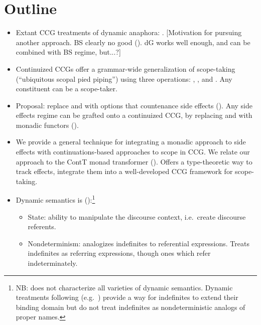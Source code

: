 \section{Outline}
\begin{itemize}	
	\item Extant CCG treatments of dynamic anaphora: \citealt{Groote:2006, BarkerShan:2008}. [Motivation for pursuing another approach. BS clearly no good (\citealt{Charlow:2010}). dG works well enough, and can be combined with BS regime, but...?]%
	
	\item Continuized CCGs offer a grammar-wide generalization of scope-taking (``ubiquitous scopal pied piping'') using three operations: , , and . Any constituent can be a scope-taker.%
	
	\item Proposal: replace  and  with options that countenance side effects (\citealt{Shan:2005}). Any side effects regime can be grafted onto a continuized CCG, by replacing  and  with monadic functors (\citealt{Moggi:1989, Wadler:1992, Wadler:1994, Wadler:1995, Shan:2002}).%
	
	\item We provide a general technique for integrating a monadic approach to side effects with continuations-based approaches to scope in CCG. We relate our approach to the ContT monad transformer (\citealt{Liangetal}). Offers a type-theoretic way to track effects, integrate them into a well-developed CCG framework for scope-taking.%
	
	\item Dynamic semantics is (\citealt{Shan:2001}):\footnote{NB: does not characterize all varieties of dynamic semantics. Dynamic treatments following \citealt{GroenendijkStokhof:1990} (e.g.~\citealt{Zimmermann:1991, Dekker:1993, Szabolcsi:2003, Groote:2006}) provide a way for indefinites to extend their binding domain but do not treat indefinites as nondeterministic analogs of proper names.}%
	\begin{itemize}
		\item State: ability to manipulate the discourse context, i.e.~create discourse referents.%
		\item Nondeterminism: analogizes indefinites to referential expressions. Treats indefinites as referring expressions, though ones which refer indeterminately.%
	\end{itemize}
	

\end{itemize}
